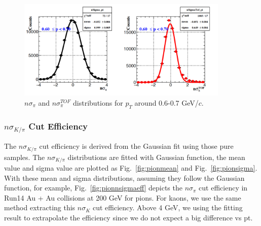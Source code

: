 \begin{figure}[htbp]
\centering
\includegraphics[keepaspectratio,width=0.9\textwidth,angle=0]{figure/Run14_D0HFT/nsigma_forPion_2.png}
\caption{$n\sigma_{\pi}$ and $n\sigma_{\pi}^{TOF}$ distributions for $p_T$ around 0.6-0.7 GeV/$c$.}
\label{fig:pion_samples}
\end{figure}

\subsubsection{$n\sigma_{K/\pi}$ Cut Efficiency}

The $n\sigma_{K/\pi}$ cut efficiency is derived from the Gaussian fit using those pure samples. The $n\sigma_{K/\pi}$ distributions are fitted with Gaussian function, the mean value and sigma value are plotted as Fig.~\ref{fig:pionmean} and Fig.~\ref{fig:pionsigma}. With these mean and sigma distributions, assuming they follow the Gaussian function, for example, Fig.~\ref{fig:pionnsigmaeff} depicts the $n\sigma_{\pi}$ cut efficiency in Run14 Au + Au collisions at 200 GeV for pions. For kaons, we use the same method extracting this $n\sigma_{K}$ cut efficiency. 
Above 4 GeV, we using the fitting result to extrapolate the efficiency since we do not expect a big difference vs pt.


